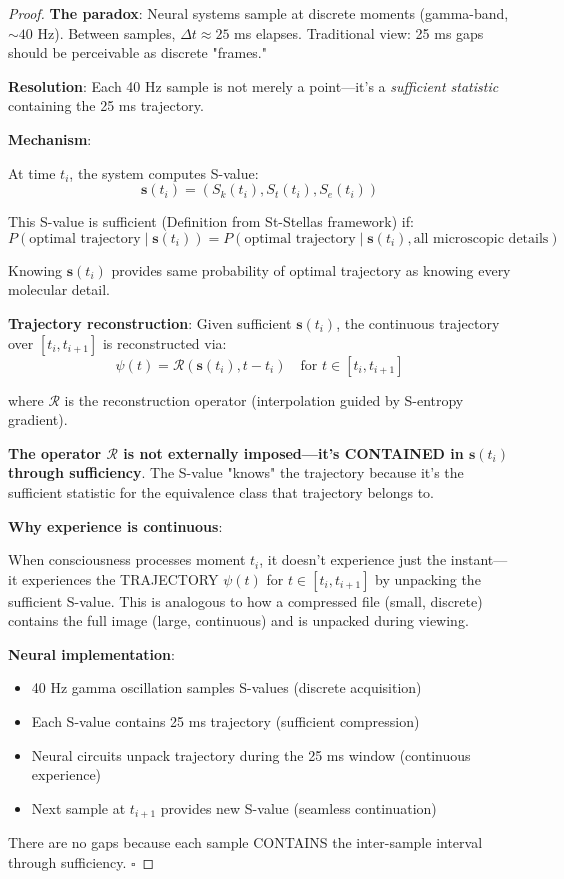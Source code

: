 \begin{proof}
\textbf{The paradox}: Neural systems sample at discrete moments (gamma-band, $\sim 40$ Hz). Between samples, $\Delta t \approx 25$ ms elapses. Traditional view: 25 ms gaps should be perceivable as discrete "frames."

\textbf{Resolution}: Each 40 Hz sample is not merely a point—it's a \textit{sufficient statistic} containing the 25 ms trajectory.

\textbf{Mechanism}:

At time $t_i$, the system computes S-value:
\begin{equation}
\mathbf{s}(t_i) = (S_k(t_i), S_t(t_i), S_e(t_i))
\end{equation}

This S-value is sufficient (Definition from St-Stellas framework) if:
\begin{equation}
P(\text{optimal trajectory} \mid \mathbf{s}(t_i)) = P(\text{optimal trajectory} \mid \mathbf{s}(t_i), \text{all microscopic details})
\end{equation}

Knowing $\mathbf{s}(t_i)$ provides same probability of optimal trajectory as knowing every molecular detail.

\textbf{Trajectory reconstruction}: Given sufficient $\mathbf{s}(t_i)$, the continuous trajectory over $[t_i, t_{i+1}]$ is reconstructed via:
\begin{equation}
\psi(t) = \mathcal{R}(\mathbf{s}(t_i), t - t_i) \quad \text{for } t \in [t_i, t_{i+1}]
\end{equation}

where $\mathcal{R}$ is the reconstruction operator (interpolation guided by S-entropy gradient).

\textbf{The operator $\mathcal{R}$ is not externally imposed—it's CONTAINED in $\mathbf{s}(t_i)$ through sufficiency}. The S-value "knows" the trajectory because it's the sufficient statistic for the equivalence class that trajectory belongs to.

\textbf{Why experience is continuous}:

When consciousness processes moment $t_i$, it doesn't experience just the instant—it experiences the TRAJECTORY $\psi(t)$ for $t \in [t_i, t_{i+1}]$ by unpacking the sufficient S-value. This is analogous to how a compressed file (small, discrete) contains the full image (large, continuous) and is unpacked during viewing.

\textbf{Neural implementation}:
\begin{itemize}
\item 40 Hz gamma oscillation samples S-values (discrete acquisition)
\item Each S-value contains 25 ms trajectory (sufficient compression)
\item Neural circuits unpack trajectory during the 25 ms window (continuous experience)
\item Next sample at $t_{i+1}$ provides new S-value (seamless continuation)
\end{itemize}

There are no gaps because each sample CONTAINS the inter-sample interval through sufficiency. $\square$
\end{proof}

